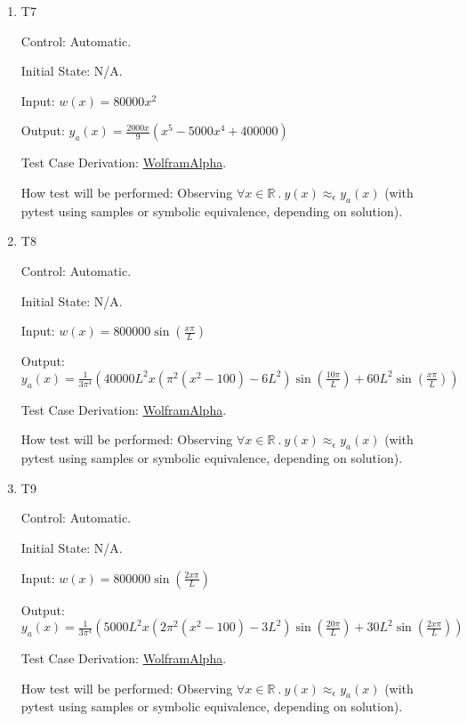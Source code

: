 \documentclass[12pt, titlepage]{article}
\begin{document}
\begin{enumerate}
    \item{T7\\}

    Control: Automatic.

    Initial State: N/A.

    Input: \(w(x) = 80000x^2\)

    Output: \(y_a(x) = \frac{2000x}{9} (x^5 - 5000x^4 + 400000)\)

    Test Case Derivation: \href{https://www.wolframalpha.com/input?i=%5B%2F%2Fmath%3Asolve+y%27%27%27%27%3D80000x%5E2%2Cy%280%29%3D0%2Cy%2810%29%3D0%2Cy%27%27%280%29%3D0%2Cy%27%27%2810%29%3D0%2F%2F%5D}{WolframAlpha}.

    How test will be performed: Observing \(\forall x \in \mathbb{R}~.~y(x)
    \approx_{\epsilon} y_a(x)\) (with pytest using samples or symbolic
    equivalence, depending on solution).

    \item{T8\\}

    Control: Automatic.

    Initial State: N/A.

    Input: \(w(x) = 800000\sin{}(\frac{x\pi}{L})\)

    Output: \(y_a(x) = \frac{1}{3\pi^{4}} (40000L^2x(\pi^2(x^2 - 100) - 6L^2)\sin{}(\frac{10\pi}{L})+60L^2\sin{}(\frac{x\pi}{L}))\)

    Test Case Derivation: \href{https://www.wolframalpha.com/input?i=%5B%2F%2Fmath%3Asolve+y%27%27%27%27%3D800000*sin%28%28x%2FL%29*pi%29%2Cy%280%29%3D0%2Cy%2810%29%3D0%2Cy%27%27%280%29%3D0%2Cy%27%27%2810%29%3D0%2F%2F%5D}{WolframAlpha}.

    How test will be performed: Observing \(\forall x \in \mathbb{R}~.~y(x)
    \approx_{\epsilon} y_a(x)\) (with pytest using samples or symbolic
    equivalence, depending on solution).

    \item{T9\\}

    Control: Automatic.

    Initial State: N/A.

    Input: \(w(x) = 800000\sin{}(\frac{2x\pi}{L})\)

    Output: \(y_a(x) = \frac{1}{3\pi^{4}} (5000L^2x(2\pi^2(x^2 - 100) - 3L^2)\sin{}(\frac{20\pi}{L})+30L^2\sin{}(\frac{2x\pi}{L}))\)

    Test Case Derivation: \href{}{WolframAlpha}.

    How test will be performed: Observing \(\forall x \in \mathbb{R}~.~y(x)
    \approx_{\epsilon} y_a(x)\) (with pytest using samples or symbolic
    equivalence, depending on solution).


\end{enumerate}
\end{document}

